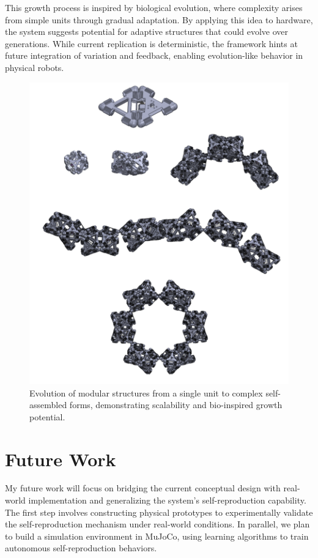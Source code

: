 \documentclass[lettersize,journal]{IEEEtran}
\begin{document}
This growth process is inspired by biological evolution, where complexity arises from simple units through gradual adaptation. By applying this idea to hardware, the system suggests potential for adaptive structures that could evolve over generations. While current replication is deterministic, the framework hints at future integration of variation and feedback, enabling evolution-like behavior in physical robots.

\begin{figure}[H]
    \centering
    \includegraphics[width=0.94\linewidth]{evolution.png}
    \caption{Evolution of modular structures from a single unit to complex self-assembled forms, demonstrating scalability and bio-inspired growth potential.}
    \label{fig:evolution}
\end{figure}

\section{Future Work}

 My future work will focus on bridging the current conceptual design with real-world implementation and generalizing the system's self-reproduction capability. The first step involves constructing physical prototypes to experimentally validate the self-reproduction mechanism under real-world conditions. In parallel, we plan to build a simulation environment in MuJoCo, using learning algorithms to train autonomous self-reproduction behaviors.
\end{document}
